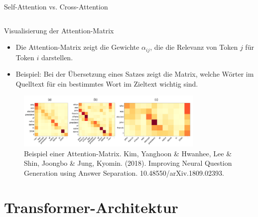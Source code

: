 \documentclass[aspectratio=1610, xcolor=dvipsnames, 9pt]{beamer}
\begin{document}
\begin{frame}{Self-Attention vs. Cross-Attention}
\begin{columns}
\begin{column}{0.5\textwidth}
{
      }
    \end{column}
  \end{columns}
\end{frame}

\begin{frame}{Visualisierung der Attention-Matrix}
  \begin{itemize}
    \item Die Attention-Matrix zeigt die Gewichte \( \alpha_{ij} \), die die Relevanz von Token \( j \) für Token \( i \) darstellen.
    \item Beispiel: Bei der Übersetzung eines Satzes zeigt die Matrix, welche Wörter im Quelltext für ein bestimmtes Wort im Zieltext wichtig sind.
  \end{itemize}
  \begin{figure}
    \centering
    \includegraphics[width=0.8\textwidth]{images/attention_matrix.png}
    \caption{Beispiel einer Attention-Matrix. Kim, Yanghoon \& Hwanhee, Lee \& Shin, Joongbo \& Jung, Kyomin. (2018). Improving Neural Question Generation using Answer Separation. 10.48550/arXiv.1809.02393. }
  \end{figure}
\end{frame}

\section{Transformer-Architektur}
\end{document}
